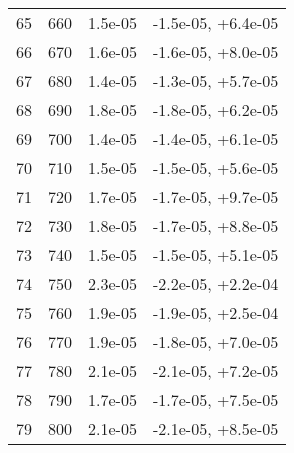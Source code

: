 \begin{table}
\begin{adjustbox}{width=1\textwidth/2}
\begin{tabular}{|c|c|c|c|}
\cline{1-4}
65 & 660 & 1.5e-05 & -1.5e-05, +6.4e-05 \\
\cline{1-4}
66 & 670 & 1.6e-05 & -1.6e-05, +8.0e-05 \\
\cline{1-4}
67 & 680 & 1.4e-05 & -1.3e-05, +5.7e-05 \\
\cline{1-4}
68 & 690 & 1.8e-05 & -1.8e-05, +6.2e-05 \\
\cline{1-4}
69 & 700 & 1.4e-05 & -1.4e-05, +6.1e-05 \\
\cline{1-4}
70 & 710 & 1.5e-05 & -1.5e-05, +5.6e-05 \\
\cline{1-4}
71 & 720 & 1.7e-05 & -1.7e-05, +9.7e-05 \\
\cline{1-4}
72 & 730 & 1.8e-05 & -1.7e-05, +8.8e-05 \\
\cline{1-4}
73 & 740 & 1.5e-05 & -1.5e-05, +5.1e-05 \\
\cline{1-4}
74 & 750 & 2.3e-05 & -2.2e-05, +2.2e-04 \\
\cline{1-4}
75 & 760 & 1.9e-05 & -1.9e-05, +2.5e-04 \\
\cline{1-4}
76 & 770 & 1.9e-05 & -1.8e-05, +7.0e-05 \\
\cline{1-4}
77 & 780 & 2.1e-05 & -2.1e-05, +7.2e-05 \\
\cline{1-4}
78 & 790 & 1.7e-05 & -1.7e-05, +7.5e-05 \\
\cline{1-4}
79 & 800 & 2.1e-05 & -2.1e-05, +8.5e-05 \\
\cline{1-4}
\end{tabular}
\end{adjustbox}
\end{table}

